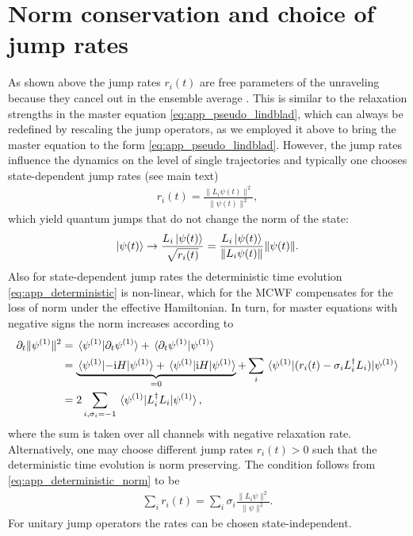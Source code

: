 \documentclass[twocolumn,prl,superscriptaddress]{revtex4-2}
\renewcommand{\i}{\mathrm i}
\begin{document}
\section{Norm conservation and choice of jump rates}
As shown above the jump rates $r_i(t)$ are free parameters of the unraveling because they cancel out in the ensemble average \cite{IKondovMschreiber2003}.  This is similar to the relaxation strengths in the master equation \cref{eq:app_pseudo_lindblad}, which can always be redefined by rescaling the jump operators, as we employed it above to bring the master equation to the form \cref{eq:app_pseudo_lindblad}. However, the jump rates influence the dynamics on the level of single trajectories and typically one chooses state-dependent jump rates (see main text)
\begin{align}
	r_i(t) = \frac{\lVert L_i\psi (t) \rVert^2}{\lVert\psi(t)\rVert^2},
\end{align} 
which yield quantum jumps that do not change the norm of the state:
\begin{align}
	\ket{\psi(t) } \rightarrow \frac{L_i \ket{\psi(t)}}{\sqrt{r_i(t)}} = \frac{L_i \ket{\psi(t)}}{\lVert L_i\psi (t) \rVert} \lVert \psi (t) \rVert.
\end{align} 
Also for state-dependent jump rates the deterministic time evolution \cref{eq:app_deterministic} is non-linear, which for the MCWF compensates for the loss of norm under the effective Hamiltonian. In turn, for master equations with negative signs the norm increases according to
\begin{align}
	\begin{split}
		\partial_t \lVert \psi^{(1)} \rVert^2 &= \ip*{\psi^{(1)}}{\partial_t \psi^{(1)}} + \ip*{\partial_t \psi^{(1)}}{\psi^{(1)}} \\ &= \underbrace{\matrixel*{\psi^{(1)}}{-\i H}{\psi^{(1)}} + \matrixel*{\psi^{(1)}}{\i H}{\psi^{(1)}}}_{=0}+ \sum_{i} \matrixel*{\psi^{(1)}}{( r_i(t) - \sigma_i L_i^\dagger L_i)}{\psi^{(1)}} \\
		&= 2 \sum_{i, \sigma_i=-1} \matrixel*{\psi^{(1)}}{L_i^\dagger L_i }{\psi^{(1)}},
	\end{split}
	\label{eq:app_deterministic_norm}
\end{align}
where the sum is taken over all channels with negative relaxation rate. 
Alternatively, one may choose different jump rates $r_i(t)>0$ such that the deterministic time evolution is norm preserving. The condition follows from \cref{eq:app_deterministic_norm} to be
\begin{align} 
	\sum_i r_i(t) = \sum_i \sigma_i \frac{\lVert L_i \psi \rVert^2 }{ \lVert \psi \rVert^2}. 
\end{align}	
For unitary jump operators the rates can be chosen state-independent. 
\end{document}
